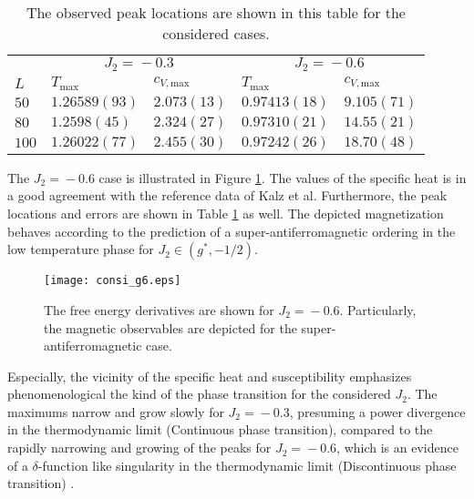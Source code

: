\begin{table}[!h]
  \centering
  \begin{tabular}{|lllll|}
  \hline
  & \multicolumn{2}{c}{$J_2\!=\!-0.3$} & \multicolumn{2}{c|}{$J_2\!=\!-0.6$} \\
  $L$ & $T_\mathrm{max}$ & $c_{V,\mathrm{max}}$ & $T_\mathrm{max}$ & $c_{V,\mathrm{max}}$ \\
  \hline
  $50$ & $1.26589(93)$ & $2.073(13)$ & $0.97413(18)$ & $9.105(71)$ \\
  $80$ & $1.2598(45)$ & $2.324(27)$ & $0.97310(21)$ & $14.55(21)$ \\
  $100$ & $1.26022(77)$ & $2.455(30)$ & $0.97242(26)$ & $18.70(48)$ \\
  \hline
  \end{tabular}
  \caption{The observed peak locations are shown in this table for the considered cases.}
  \label{table:heat_consi}
\end{table}

The $J_2\!=\!-0.6$ case is illustrated in Figure \ref{fig:consi_g6}. The values of the specific heat is in a good agreement with the reference data of Kalz et al.
Furthermore, the peak locations and errors are shown in Table \ref{table:heat_consi} as well. The depicted magnetization behaves according to
the prediction of a super-antiferromagnetic ordering in the low temperature phase for $J_2\!\in\!(g^*,-1/2)$.  

\begin{figure}[!h]
  \texttt{[image: consi\_g6.eps]}
  \caption{The free energy derivatives are shown for $J_2\!=\!-0.6$. Particularly, the magnetic observables
           are depicted for the super-antiferromagnetic case.}
  \label{fig:consi_g6}
\end{figure}

Especially, the vicinity of the specific heat and susceptibility emphasizes phenomenological the kind of the phase transition for the considered 
$J_2$. The maximums narrow and grow slowly for $J_2\!=\!-0.3$, presuming a power divergence in the thermodynamic limit (Continuous phase transition), 
compared to the rapidly narrowing and growing of the peaks for $J_2\!=\!-0.6$, which is an evidence of a $\delta$-function like singularity in the 
thermodynamic limit (Discontinuous phase transition) \cite{Kalz2008}.



